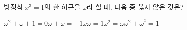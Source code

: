 방정식 $x^3=1$의 한 허근을 $\omega$라 할 때, 다음 중 옳지 \underline{않은} 것은? 
\begin{choicesii}{$\omega^2+\omega+1=0$}{$\omega+\bar{\omega}=-1$}{$\omega\bar{\omega}=1$}{$\omega^2=\bar{\omega}$}{$\omega^2+\bar{\omega}^2=1$}\end{choicesii}
